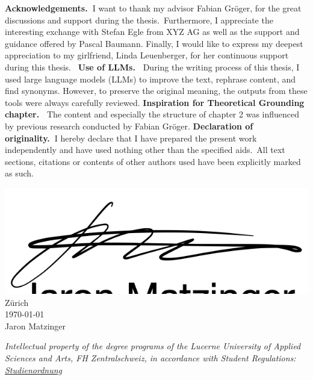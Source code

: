 \begin{titlepage}
\begin{flushleft}
    \noindent
    \textbf{Acknowledgements.\ }I want to thank my advisor Fabian Gröger, for the great discussions and support during the thesis.\ Furthermore, I appreciate the interesting exchange with Stefan Egle from XYZ AG as well as the support and guidance offered by Pascal Baumann. Finally, I would like to express my deepest appreciation to my girlfriend, Linda Leuenberger, for her continuous support during this thesis.\
    \newline
    \newline
    \textbf{Use of LLMs.\ } During the writing process of this thesis, I used large language models (LLMs) to improve the text, rephrase content, and find synonyms. However, to preserve the original meaning, the outputs from these tools were always carefully reviewed.
    \newline
    \newline
    \textbf{Inspiration for Theoretical Grounding chapter.\ } The content and especially the structure of chapter 2 was influenced by previous research conducted by Fabian Gröger.
    \newline
    \newline
    \textbf{Declaration of originality.\ }I hereby declare that I have prepared the present work independently and have used nothing other than the specified aids.\ All text sections, citations or contents of other authors used have been explicitly marked as such.\ 

    \vspace{0.25cm}
    \begin{center}
        \includegraphics[scale=0.3]{assets/img/unterschrift.png} \\
        Zürich \\ 
        \today \\ 
        Jaron Matzinger
    \end{center}
    \vspace{0.75cm}
    
    \textit{Intellectual property of the degree programs of the Lucerne University of Applied Sciences and Arts, FH Zentralschweiz, in accordance with Student Regulations: \href{https://srl.lu.ch/app/de/texts_of_law/521/versions/4065}{Studienordnung}}

    \end{flushleft}

\end{titlepage}
	
\clearpage